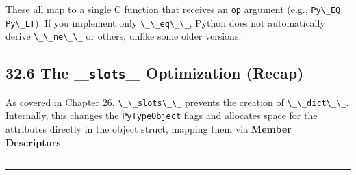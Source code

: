 These all map to a single C function that receives an
\passthrough{\lstinline!op!} argument (e.g.,
\passthrough{\lstinline!Py\_EQ!}, \passthrough{\lstinline!Py\_LT!}). If
you implement only \passthrough{\lstinline!\_\_eq\_\_!}, Python does not
automatically derive \passthrough{\lstinline!\_\_ne\_\_!} or others,
unlike some older versions.

\hypertarget{the-__slots__-optimization-recap}{%
\subsection{\texorpdfstring{32.6 The \texttt{\_\_slots\_\_} Optimization
(Recap)}{32.6 The \_\_slots\_\_ Optimization (Recap)}}\label{the-__slots__-optimization-recap}}

As covered in Chapter 26, \passthrough{\lstinline!\_\_slots\_\_!}
prevents the creation of \passthrough{\lstinline!\_\_dict\_\_!}.
Internally, this changes the \passthrough{\lstinline!PyTypeObject!}
flags and allocates space for the attributes directly in the object
struct, mapping them via \textbf{Member Descriptors}.

\begin{center}\rule{0.5\linewidth}{0.5pt}\end{center}

\begin{center}\rule{0.5\linewidth}{0.5pt}\end{center}
